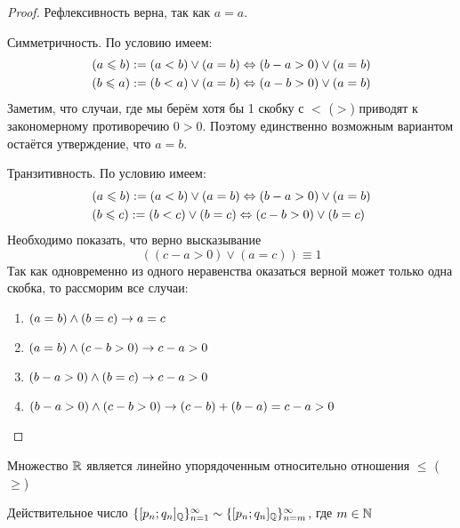 \begin{proof}
    Рефлексивность верна, так как $a = a$.
    
    Симметричность. По условию имеем:
    \begin{align*}
        &(a \leqslant b) := (a < b) \vee (a = b) \Leftrightarrow (b - a > 0) \vee (a = b) \\
        &(b \leqslant a) := (b < a) \vee (a = b) \Leftrightarrow (a - b > 0) \vee (a = b)
    \end{align*}
    Заметим, что случаи, где мы берём хотя бы 1 скобку с $<$ ($>$) приводят к закономерному противоречию $0 > 0$. Поэтому единственно возможным вариантом остаётся утверждение, что $a = b$.
    
    Транзитивность. По условию имеем:
    \begin{align*}
        &(a \leqslant b) := (a < b) \vee (a = b) \Leftrightarrow (b - a > 0) \vee (a = b) \\
        &(b \leqslant c) := (b < c) \vee (b = c) \Leftrightarrow (c - b > 0) \vee (b = c)
    \end{align*}
    Необходимо показать, что верно высказывание
    $$
        ((c - a > 0) \vee (a = c)) \equiv 1
    $$
    Так как одновременно из одного неравенства оказаться верной может только одна скобка, то рассморим все случаи:
    \begin{enumerate}
        \item $(a = b) \wedge (b = c) \rightarrow a = c$
        \item $(a = b) \wedge (c - b > 0) \rightarrow c - a > 0$
        \item $(b - a > 0) \wedge (b = c) \rightarrow c - a > 0$
        \item $(b - a > 0) \wedge (c - b > 0) \rightarrow (c - b) + (b - a) = c - a > 0$
    \end{enumerate}
\end{proof}

\begin{proposition}
    Множество $\mathbb{R}$ является линейно упорядоченным относительно отношения $\le$ ($\ge$)
\end{proposition}

\begin{note}
    Действительное число $\{[p_n; q_n]_{\mathbb{Q}}\}_{n = 1}^\infty \sim \{[p_n; q_n]_{\mathbb{Q}}\}_{n = m}^\infty$, где $m \in \mathbb{N}$
\end{note}

